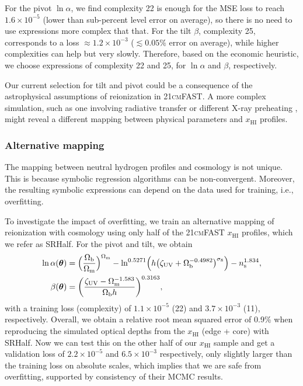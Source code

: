 \documentclass[12pt]{article}
\newcommand{\vtheta}{\boldsymbol{\theta}}
\newcommand{\ns}{n_\mathrm{s}}
\newcommand{\Omegam}{\Omega_\mathrm{m}}
\newcommand{\Omegab}{\Omega_\mathrm{b}}
\newcommand{\zetaUV}{\zeta_\mathrm{UV}}
\newcommand{\HI}{\mathrm{HI}}
\newcommand{\ap}{\alpha}
\newcommand{\tilt}{\beta}
\begin{document}
For the pivot $\ln\ap$, we find complexity 22 is enough for the MSE loss
to reach $1.6 \times 10^{-5}$ (lower than sub-percent level error on
average), so there is no need to use expressions more complex that that.
For the tilt $\tilt$, complexity 25, corresponds to a loss $\approx
1.2\times10^{-3}$ ($\lesssim 0.05\%$ error on average), while higher
complexities can help but very slowly.
Therefore, based on the economic heuristic, we choose expressions of
complexity 22 and 25, for $\ln\ap$ and $\tilt$, respectively.

Our current selection for tilt and pivot could be a consequence of the
astrophysical assumptions of reionization in \textsc{21cmFAST}.
A more complex simulation, such as one involving radiative transfer or
different X-ray preheating \cite{Montero2024}, might reveal a different
mapping between physical parameters and $x_\HI$ profiles.


\subsubsection*{Alternative mapping}
\label{sec:SRHalf}

The mapping between neutral hydrogen profiles and cosmology is not
unique.
This is because symbolic regression algorithms can be non-convergent.
Moreover, the resulting symbolic expressions can depend on the data used
for training, i.e., overfitting.

To investigate the impact of overfitting, we train an alternative
mapping of reionization with cosmology using only half of the
\textsc{21cmFAST} $x_\HI$ profiles, which we refer as SRHalf.
For the pivot and tilt, we obtain
%
\begin{align}
\label{eq:SRHalf_a}
\ln\ap(\vtheta) &= \Bigl(\frac{\Omegab}{\Omegam}\Bigr)^{\Omegam}
  - \ln^{0.5271} \Bigl(h \bigl(\zetaUV
    + \Omegab^{-0.4982}\bigr)^{\sigma_8}\Bigr)
  - \ns^{1.834}, \\
%
\label{eq:SRHalf_b}
\beta(\vtheta) &= \biggl(\frac{\zetaUV - \Omegam^{-1.583}}{\Omegab h}
  \biggr)^{0.3163},
\end{align}
%
with a training loss (complexity) of $1.1 \times 10^{-5}$ (22) and $3.7
\times 10^{-3}$ (11), respectively.
Overall, we obtain a relative root mean squared error of 0.9\% when
reproducing the simulated optical depths from the $x_\HI$ (edge + core)
with SRHalf.
Now we can test this on the other half of our $x_\HI$ sample and get a
validation loss of $2.2 \times 10^{-5}$ and $6.5 \times 10^{-3}$
respectively, only slightly larger than the training loss on absolute
scales, which implies that we are safe from overfitting, supported by
consistency of their MCMC results.
\end{document}
